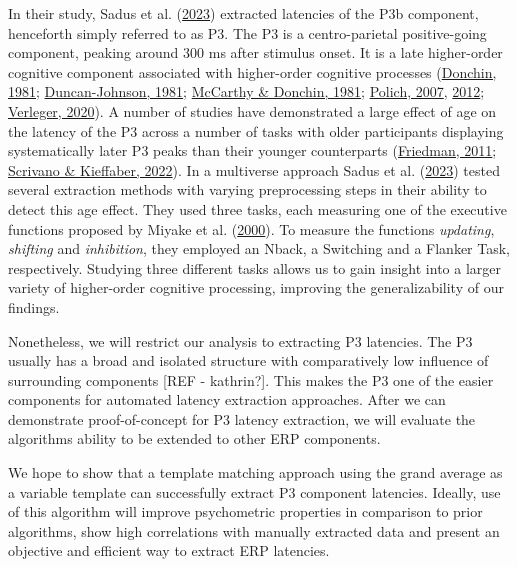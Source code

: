 \documentclass[
  man]{apa7}
\begin{document}
In their study, Sadus et al. (\protect\hyperlink{ref-sadus2023multiverse}{2023}) extracted latencies of the P3b component, henceforth simply referred to as P3. The P3 is a centro-parietal positive-going component, peaking around 300 ms after stimulus onset. It is a late higher-order cognitive component associated with higher-order cognitive processes (\protect\hyperlink{ref-donchin1981surprise}{Donchin, 1981}; \protect\hyperlink{ref-duncan1981young}{Duncan-Johnson, 1981}; \protect\hyperlink{ref-mccarthy1981metric}{McCarthy \& Donchin, 1981}; \protect\hyperlink{ref-polich2007updating}{Polich, 2007}, \protect\hyperlink{ref-polich2012neuropsychology}{2012}; \protect\hyperlink{ref-verleger2020effects}{Verleger, 2020}). A number of studies have demonstrated a large effect of age on the latency of the P3 across a number of tasks with older participants displaying systematically later P3 peaks than their younger counterparts (\protect\hyperlink{ref-friedman2012components}{Friedman, 2011}; \protect\hyperlink{ref-scrivano2022behavioral}{Scrivano \& Kieffaber, 2022}). In a multiverse approach Sadus et al. (\protect\hyperlink{ref-sadus2023multiverse}{2023}) tested several extraction methods with varying preprocessing steps in their ability to detect this age effect. They used three tasks, each measuring one of the executive functions proposed by Miyake et al. (\protect\hyperlink{ref-miyake2000unity}{2000}). To measure the functions \emph{updating}, \emph{shifting} and \emph{inhibition}, they employed an Nback, a Switching and a Flanker Task, respectively. Studying three different tasks allows us to gain insight into a larger variety of higher-order cognitive processing, improving the generalizability of our findings.

Nonetheless, we will restrict our analysis to extracting P3 latencies. The P3 usually has a broad and isolated structure with comparatively low influence of surrounding components {[}REF - kathrin?{]}. This makes the P3 one of the easier components for automated latency extraction approaches. After we can demonstrate proof-of-concept for P3 latency extraction, we will evaluate the algorithms ability to be extended to other ERP components.

We hope to show that a template matching approach using the grand average as a variable template can successfully extract P3 component latencies. Ideally, use of this algorithm will improve psychometric properties in comparison to prior algorithms, show high correlations with manually extracted data and present an objective and efficient way to extract ERP latencies.
\end{document}
